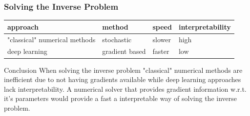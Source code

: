 \documentclass{beamer}
\begin{document}
\begin{frame}
	\frametitle{Solving the Inverse Problem}
\begin{minipage}[t][0.35\paperheight][t]{\textwidth}
\begin{tabular}{| m{2cm} | m{2cm}| m{2cm} | m{2.4cm} | } 
	\hline
	approach & method & speed & interpretability\\ 
	\hline
	\hline
	"classical" numerical methods & stochastic & slower & high \\ 
	\hline
	deep learning & gradient based & faster & low \\ 
	\hline
\end{tabular}
\end{minipage}
\hfill
\begin{minipage}[t][0.35\paperheight][t]{\textwidth}
	\begin{block}{Conclusion}
		When solving the inverse problem "classical" numerical methods are inefficient due to not having gradients available while deep learning approaches lack interpretability.
		A numerical solver that provides gradient information w.r.t. it's parameters would provide a fast a interpretable way of solving the inverse problem.
	\end{block}
\end{minipage}

\end{frame}

\end{document}
